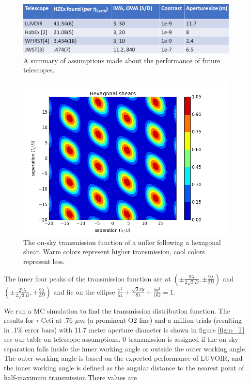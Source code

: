 \documentclass{article}
\begin{document}
	\begin{figure}
	\includegraphics[width = \linewidth]{telescope_table.png}
	\caption{A summary of assumptions made about the performance of future telescopes.}
	\label{fig:telescope}
	\end{figure}
	
	\begin{figure} 
		\includegraphics[width = \linewidth]{T_xy.png}
		\caption{The on-sky transmission function of a nuller following a hexagonal shear. Warm colors represent higher transmission, cool colors represent less.}
		\label{fig:T_xy}
	\end{figure}
	
The inner four peaks of the transmission function are at $\left( \pm \frac{9 \lambda}{2 \sqrt{3} D}, \pm \frac{9 \lambda}{2 D} \right)$ and $\left(\pm \frac{27 \lambda}{2 \sqrt{3} D}, \mp\frac{9 \lambda}{2 D} \right)$ and lie on the ellipse $\frac {x^2}{54} + \frac{\sqrt{3} xy}{81} + \frac{5 y^2}{162} = 1$.
	
	We run a MC simulation to find the transmission distribution function. The results for $\tau$ Ceti at .76 $\mu m$ (a prominent O2 line) and a million trials (resulting in .1\% error bars) with 11.7 meter aperture diameter is shown in figure \ref{fig:p_T} see our table on telescope assumptions. 0 transmission is assigned if the on-sky separation falls inside the inner working angle or outside the outer working angle. The outer working angle is based on the expected performance of LUVOIR, and the inner working angle is defined as the angular distance to the nearest point of half-maximum transmission.There values are
	
\end{document}
